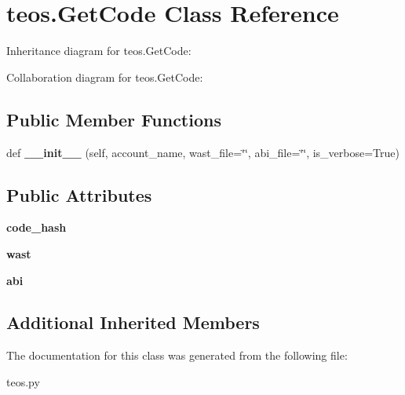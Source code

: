\hypertarget{classteos_1_1GetCode}{}\section{teos.\+Get\+Code Class Reference}
\label{classteos_1_1GetCode}


Inheritance diagram for teos.\+Get\+Code\+:


Collaboration diagram for teos.\+Get\+Code\+:
\subsection*{Public Member Functions}
\begin{DoxyCompactItemize}
\item 
\mbox{\label{classteos_1_1GetCode_a173ce22e8cb42f0daaeff90020a13576}} 
def {\bfseries \+\_\+\+\_\+init\+\_\+\+\_\+} (self, account\+\_\+name, wast\+\_\+file=\char`\"{}\char`\"{}, abi\+\_\+file=\char`\"{}\char`\"{}, is\+\_\+verbose=True)
\end{DoxyCompactItemize}
\subsection*{Public Attributes}
\begin{DoxyCompactItemize}
\item 
\mbox{\label{classteos_1_1GetCode_aa787ddfb932617079bd677c304670467}} 
{\bfseries code\+\_\+hash}
\item 
\mbox{\label{classteos_1_1GetCode_a86744b2351daf3cc3a01bcb0bba52f67}} 
{\bfseries wast}
\item 
\mbox{\label{classteos_1_1GetCode_a38cf946f7f2699b6241ebfeb166ba038}} 
{\bfseries abi}
\end{DoxyCompactItemize}
\subsection*{Additional Inherited Members}


The documentation for this class was generated from the following file\+:\begin{DoxyCompactItemize}
\item 
teos.\+py\end{DoxyCompactItemize}
